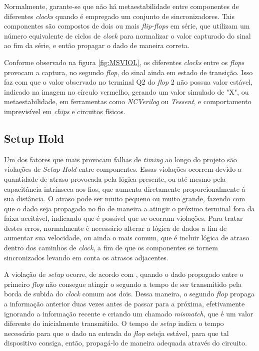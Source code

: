 \documentclass[
	12pt,				%
    oneside,			%
	a4paper,			%
	english,			%
	french,				%
	spanish,			%
	brazil				%
	]{abntex2}
\begin{document}
Normalmente, garante-se que não há metaestabilidade entre componentes de diferentes \textit{clocks} quando é empregado um conjunto de sincronizadores. Tais componentes são compostos de dois ou mais \textit{flip-flops} em série, que utilizam um número equivalente de ciclos de \textit{clock} para normalizar o valor capturado do sinal ao fim da série, e então propagar o dado de maneira correta.



Conforme observado na figura \ref{fig:MSVIOL}, os diferentes \textit{clocks} entre os \textit{flops} provocam a captura, no segundo \textit{flop}, do sinal ainda em estado de transição. Isso faz com que o valor observado no terminal Q2 do \textit{flop} 2 não possua valor estável, indicado na imagem no círculo vermelho, gerando um valor simulado de "X", ou metaestabilidade, em ferramentas como \textit{NCVerilog} ou \textit{Tessent}, e comportamento imprevisível em \textit{chips} e circuitos físicos.

\subsection{Setup Hold}

Um dos fatores que mais provocam falhas de \textit{timing} ao longo do projeto são violações de \textit{Setup-Hold} entre componentes. Essas violações ocorrem devido a quantidade de atraso provocada pela lógica presente, ou até mesmo pela capacitância intrínseca aos fios, que aumenta diretamente proporcionalmente á sua distância. O atraso pode ser muito pequeno ou muito grande, fazendo com que o dado seja propagado no fio de maneira a atingir o próximo terminal fora da faixa aceitável, indicando que é possível que se ocorram violações. Para tratar destes erros, normalmente é necessário alterar a lógica de dados a fim de aumentar sua velocidade, ou ainda o mais comum, que é incluir lógica de atraso dentro dos caminhos de \textit{clock}, a fim de que os componentes se tornem sincronizados levando em conta os atrasos adjacentes.

A violação de \textit{setup} ocorre, de acordo com \citeauthor{Wang}, quando o dado propagado entre o primeiro \textit{flop} não consegue atingir o segundo a tempo de ser transmitido pela borda de subida do \textit{clock} comum aos dois. Dessa maneira, o segundo \textit{flop} propaga a informação anterior duas vezes antes de passar para a próxima, efetivamente ignorando a informação recente e criando um chamado \textit{mismatch}, que é um valor diferente do inicialmente transmitido. O tempo de \textit{setup} indica o tempo necessário para que o dado na entrada do \textit{flop} esteja estável, para que tal dispositivo consiga, então, propagá-lo de maneira adequada através do circuito. 
\end{document}
